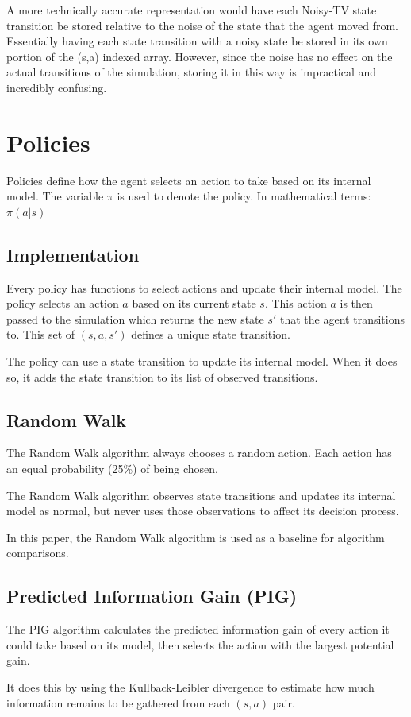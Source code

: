 \documentclass[12pt]{thesis}
\begin{document}
A more technically accurate representation would have each Noisy-TV state transition be stored relative to the noise of the state that the agent moved from. Essentially having each state transition with a noisy state be stored in its own portion of the (s,a) indexed array. However, since the noise has no effect on the actual transitions of the simulation, storing it in this way is impractical and incredibly confusing.

\section{Policies}
Policies define how the agent selects an action to take based on its internal model. The variable $\pi$ is used to denote the policy. In mathematical terms: $\pi(a | s)$
\subsection{Implementation}
Every policy has functions to select actions and update their internal model. The policy selects an action $a$ based on its current state $s$. This action $a$ is then passed to the simulation which returns the new state $s'$ that the agent transitions to. This set of $(s,a,s')$ defines a unique state transition.

The policy can use a state transition to update its internal model. When it does so, it adds the state transition to its list of observed transitions.
\subsection{Random Walk}
The Random Walk algorithm always chooses a random action. Each action has an equal probability (25\%) of being chosen.

The Random Walk algorithm observes state transitions and updates its internal model as normal, but never uses those observations to affect its decision process.

In this paper, the Random Walk algorithm is used as a baseline for algorithm comparisons.
\subsection{Predicted Information Gain (PIG)}
The PIG algorithm calculates the predicted information gain of every action it could take based on its model, then selects the action with the largest potential gain.

It does this by using the Kullback-Leibler divergence to estimate how much information remains to be gathered from each $(s,a)$ pair. 
\end{document}
